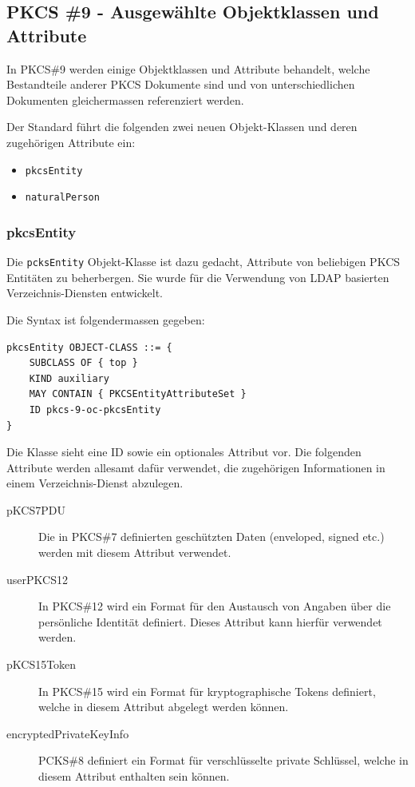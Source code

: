 \documentclass[10pt,a4paper]{article}
\begin{document}
\subsection{PKCS \#9 - Ausgewählte Objektklassen und Attribute}
In PKCS\#9 werden einige Objektklassen und Attribute behandelt, welche Bestandteile
anderer PKCS Dokumente sind und von unterschiedlichen Dokumenten gleichermassen
referenziert werden.

Der Standard führt die folgenden zwei neuen Objekt-Klassen und deren zugehörigen Attribute
ein:
\begin{itemize}
    \item \texttt{pkcsEntity}
    \item \texttt{naturalPerson}
\end{itemize}

\subsubsection{pkcsEntity}
Die \texttt{pcksEntity} Objekt-Klasse ist dazu gedacht, Attribute von beliebigen PKCS
Entitäten zu beherbergen. Sie wurde für die Verwendung von LDAP basierten
Verzeichnis-Diensten entwickelt.

Die Syntax ist folgendermassen gegeben: 
\begin{verbatim}
pkcsEntity OBJECT-CLASS ::= {
    SUBCLASS OF { top }
    KIND auxiliary
    MAY CONTAIN { PKCSEntityAttributeSet }
    ID pkcs-9-oc-pkcsEntity
}
\end{verbatim}

Die Klasse sieht eine ID sowie ein optionales Attribut vor. Die folgenden Attribute werden
allesamt dafür verwendet, die zugehörigen Informationen in einem Verzeichnis-Dienst
abzulegen.
\begin{description}
    \item[pKCS7PDU] Die in PKCS\#7 definierten geschützten Daten (enveloped, signed etc.)
        werden mit diesem Attribut verwendet.
    \item[userPKCS12] In PKCS\#12 wird ein Format für den Austausch von Angaben über die
        persönliche Identität definiert. Dieses Attribut kann hierfür verwendet werden.
    \item[pKCS15Token] In PKCS\#15 wird ein Format für kryptographische Tokens definiert,
        welche in diesem Attribut abgelegt werden können.
    \item[encryptedPrivateKeyInfo] PCKS\#8 definiert ein Format für verschlüsselte private
        Schlüssel, welche in diesem Attribut enthalten sein können.
\end{description}
\end{document}
